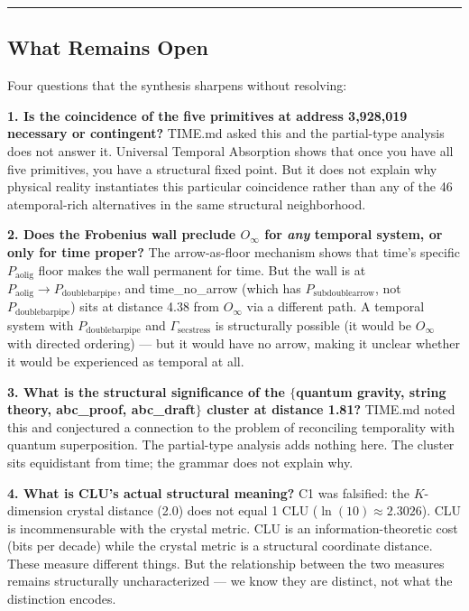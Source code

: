 \documentclass[12pt,a4paper]{article}
\begin{document}
\begin{center}
\rule{0.5\textwidth}{0.4pt}
\end{center}

\subsection{What Remains Open}

Four questions that the synthesis sharpens without resolving:

\textbf{1. Is the coincidence of the five primitives at address 3,928,019 necessary or contingent?} TIME.md asked this and the partial-type analysis does not answer it. Universal Temporal Absorption shows that once you have all five primitives, you have a structural fixed point. But it does not explain why physical reality instantiates this particular coincidence rather than any of the 46 atemporal-rich alternatives in the same structural neighborhood.

\textbf{2. Does the Frobenius wall preclude $O_{\infty}$ for \emph{any} temporal system, or only for time proper?} The arrow-as-floor mechanism shows that time's specific $P_{\text{aolig}}$ floor makes the wall permanent for time. But the wall is at $P_{\text{aolig}} \to P_{\text{doublebarpipe}}$, and time\_no\_arrow (which has $P_{\text{subdoublearrow}}$, not $P_{\text{doublebarpipe}}$) sits at distance 4.38 from $O_{\infty}$ via a different path. A temporal system with $P_{\text{doublebarpipe}}$ and $\Gamma_{\text{secstress}}$ is structurally possible (it would be $O_{\infty}$ with directed ordering) --- but it would have no arrow, making it unclear whether it would be experienced as temporal at all.

\textbf{3. What is the structural significance of the $\{$quantum gravity, string theory, abc\_proof, abc\_draft$\}$ cluster at distance 1.81?} TIME.md noted this and conjectured a connection to the problem of reconciling temporality with quantum superposition. The partial-type analysis adds nothing here. The cluster sits equidistant from time; the grammar does not explain why.

\textbf{4. What is CLU's actual structural meaning?} C1 was falsified: the $K$-dimension crystal distance (2.0) does not equal 1 CLU ($\ln(10) \approx 2.3026$). CLU is incommensurable with the crystal metric. CLU is an information-theoretic cost (bits per decade) while the crystal metric is a structural coordinate distance. These measure different things. But the relationship between the two measures remains structurally uncharacterized --- we know they are distinct, not what the distinction encodes.
\end{document}
